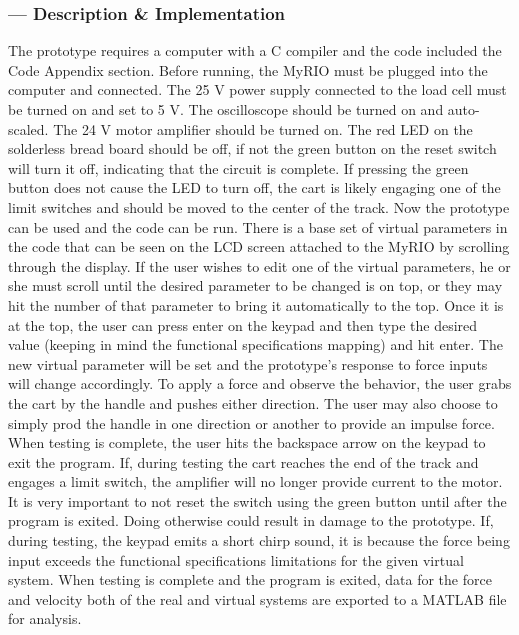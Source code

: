 \subsubsection*{ --- Description \& Implementation}
The prototype requires a computer with a C compiler and the code included the Code Appendix section. Before running, the MyRIO must be plugged into the computer and connected. The 25 V power supply connected to the load cell must be turned on and set to 5 V. The oscilloscope should be turned on and auto-scaled. The 24 V motor amplifier should be turned on. The red LED on the solderless bread board should be off, if not the green button on the reset switch will turn it off, indicating that the circuit is complete. If pressing the green button does not cause the LED to turn off, the cart is likely engaging one of the limit switches and should be moved to the center of the track. 
\newline \indent Now the prototype can be used and the code can be run. There is a base set of virtual parameters in the code that can be seen on the LCD screen attached to the MyRIO by scrolling through the display. If the user wishes to edit one of the virtual parameters, he or she must scroll until the desired parameter to be changed is on top, or they may hit the number of that parameter to bring it automatically to the top. Once it is at the top, the user can press enter on the keypad and then type the desired value (keeping in mind the functional specifications mapping) and hit enter. The new virtual parameter will be set and the prototype's response to force inputs will change accordingly. 
\newline \indent To apply a force and observe the behavior, the user grabs the cart by the handle and pushes either direction. The user may also choose to simply prod the handle in one direction or another to provide an impulse force. 
\newline \indent When testing is complete, the user hits the backspace arrow on the keypad to exit the program. If, during testing the cart reaches the end of the track and engages a limit switch, the amplifier will no longer provide current to the motor. It is very important to not reset the switch using the green button until after the program is exited. Doing otherwise could result in damage to the prototype. If, during testing, the keypad emits a short chirp sound, it is because the force being input exceeds the functional specifications limitations for the given virtual system. When testing is complete and the program is exited, data for the force and velocity both of the real and virtual systems are exported to a MATLAB file for analysis.